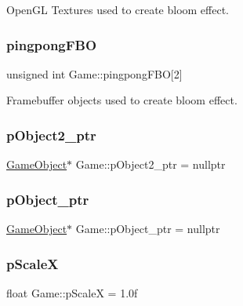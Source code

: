 Open\+GL Textures used to create bloom effect. 

\mbox{\label{class_game_a0160418629f882b089847e9ddd6901f5}} 
\subsubsection{\texorpdfstring{pingpongFBO}{pingpongFBO}}
{\footnotesize\ttfamily unsigned int Game\+::pingpong\+F\+BO\mbox{[}2\mbox{]}\hspace{0.3cm}{\ttfamily [protected]}}



Framebuffer objects used to create bloom effect. 

\mbox{\label{class_game_a9d8260c3af3cadc4175b9d6fdbd60fd9}} 
\subsubsection{\texorpdfstring{pObject2\_ptr}{pObject2\_ptr}}
{\footnotesize\ttfamily \mbox{\hyperlink{class_game_object}{Game\+Object}}$\ast$ Game\+::p\+Object2\+\_\+ptr = nullptr}

\mbox{\label{class_game_a67c299035a53da108a53752997d1a79b}} 
\subsubsection{\texorpdfstring{pObject\_ptr}{pObject\_ptr}}
{\footnotesize\ttfamily \mbox{\hyperlink{class_game_object}{Game\+Object}}$\ast$ Game\+::p\+Object\+\_\+ptr = nullptr}

\mbox{\label{class_game_a7ceb6c09bd7968b1cbfd949de3c53d73}} 
\subsubsection{\texorpdfstring{pScaleX}{pScaleX}}
{\footnotesize\ttfamily float Game\+::p\+ScaleX = 1.\+0f}

\mbox{\label{class_game_abb3c306f0ca519ca040562c6b85f49a1}} 

